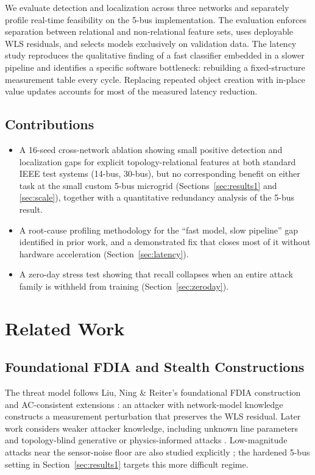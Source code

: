 \documentclass[conference]{IEEEtran}
\begin{document}
We evaluate detection and localization across three networks and separately profile real-time feasibility on the 5-bus implementation. The evaluation enforces separation between relational and non-relational feature sets, uses deployable WLS residuals, and selects models exclusively on validation data. The latency study reproduces the qualitative finding of a fast classifier embedded in a slower pipeline \cite{abukhousa2026latency} and identifies a specific software bottleneck: rebuilding a fixed-structure measurement table every cycle. Replacing repeated object creation with in-place value updates accounts for most of the measured latency reduction.

\subsection{Contributions}
\begin{itemize}
\item A 16-seed cross-network ablation showing small positive detection and localization gaps for explicit topology-relational features at both standard IEEE test systems (14-bus, 30-bus), but no corresponding benefit on either task at the small custom 5-bus microgrid (Sections~\ref{sec:results1} and \ref{sec:scale}), together with a quantitative redundancy analysis of the 5-bus result.
\item A root-cause profiling methodology for the ``fast model, slow pipeline'' gap identified in prior work, and a demonstrated fix that closes most of it without hardware acceleration (Section~\ref{sec:latency}).
\item A zero-day stress test showing that recall collapses when an entire attack family is withheld from training (Section~\ref{sec:zeroday}).
\end{itemize}

\section{Related Work}
\label{sec:related}

\subsection{Foundational FDIA and Stealth Constructions}
The threat model follows Liu, Ning \& Reiter's foundational FDIA construction \cite{liu2011false} and AC-consistent extensions \cite{anwar2016modeling}: an attacker with network-model knowledge constructs a measurement perturbation that preserves the WLS residual. Later work considers weaker attacker knowledge, including unknown line parameters \cite{du2021targeted} and topology-blind generative or physics-informed attacks \cite{zhao2025blind,falas2026learning}. Low-magnitude attacks near the sensor-noise floor are also studied explicitly \cite{li2026physically}; the hardened 5-bus setting in Section~\ref{sec:results1} targets this more difficult regime.
\end{document}
